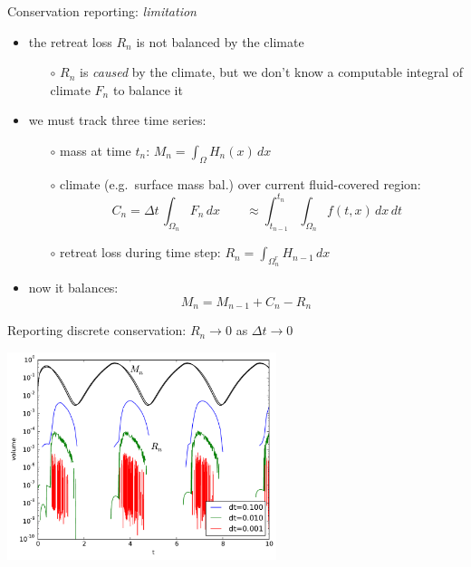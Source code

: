 \documentclass{beamer}
\begin{document}
\begin{frame}{Conservation reporting: \emph{limitation}}

\begin{itemize}
\item \alert{the retreat loss $R_n$ is not balanced by the climate}
  \begin{itemize}
  \item[$\circ$] $R_n$ is \emph{caused} by the climate, but we don't know a computable integral of climate $F_n$ to balance it
  \end{itemize}
\item we must track \alert{three} time series:
  \begin{itemize}
  \item[$\circ$] mass at time $t_n$: \qquad $M_n = \int_\Omega H_n(x)\,dx$

  \smallskip
  \item[$\circ$] climate (e.g.~surface mass bal.) over current fluid-covered region:
     $$C_n = \Delta t\, \int_{\Omega_n} F_n \,dx \qquad \approx \int_{t_{n-1}}^{t_n} \int_{\Omega_n} f(t,x) \,dx\,dt$$
  \item[$\circ$] retreat loss during time step: \qquad $R_n = \int_{\Omega_n^r} H_{n-1} \,dx$
  \end{itemize}
\item now it balances:
     $$M_n = M_{n-1} + C_n - R_n$$
\end{itemize}
\end{frame}


\begin{frame}{Reporting discrete conservation: $R_n\to 0$ as $\Delta t\to 0$}

\begin{center}
\vspace{-3.3mm}


\vspace{-1.1mm}
\includegraphics[width=0.59\textwidth,keepaspectratio=true]{masstimeseries} \, \phantom{!}
\end{center}
\end{frame}
\end{document}
